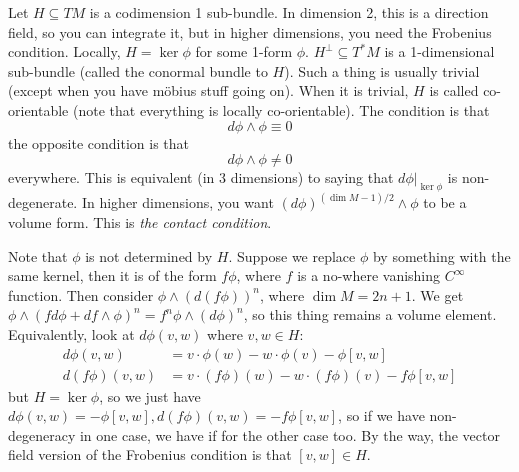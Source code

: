  \setcounter{lecture}{6}

 Let $H\subseteq TM$ is a codimension 1 sub-bundle.  In dimension
 2, this is a direction field, so you can integrate it, but in
 higher dimensions, you need the Frobenius condition.  Locally,
 $H=\ker \phi$ for some 1-form $\phi$.  $H^\perp \subseteq T^*M$
 is a 1-dimensional sub-bundle (called the conormal bundle to
 $H$).  Such a thing is usually trivial (except when you have
 m\"obius stuff going on).  When it is trivial, $H$ is called
 co-orientable (note that everything is locally co-orientable).
 The condition is that
 \[
    d\phi\wedge \phi \equiv 0
 \]
 the opposite condition is that
 \[
    d\phi\wedge \phi \not= 0
 \]
 everywhere.  This is equivalent (in 3 dimensions) to saying that
 $d\phi|_{\ker \phi}$ is non-degenerate.  In higher dimensions,
 you want $(d\phi)^{(\dim M -1)/2}\wedge \phi$ to be a volume
 form.  This is \emph{the contact condition}.

 Note that $\phi$ is not determined by $H$.  Suppose we replace
 $\phi$ by something with the same kernel, then it is of the form
 $f\phi$, where $f$ is a no-where vanishing $C^\infty$ function.
 Then consider $\phi\wedge (d(f\phi))^n$, where $\dim M=2n+1$.  We
 get $\phi\wedge (fd\phi + df\wedge \phi)^n = f^n\phi\wedge
 (d\phi)^n$, so this thing remains a volume element.
 Equivalently, look at $d\phi(v,w)$ where $v,w\in H$:
 \begin{align*}
   d\phi(v,w) &= v\cdot \phi(w) - w\cdot \phi(v) - \phi[v,w]\\
   d(f\phi)(v,w) & = v\cdot (f\phi)(w) - w\cdot (f\phi)(v) -
   f\phi[v,w]
 \end{align*}
 but $H = \ker \phi$, so we just have $d\phi(v,w) = -\phi[v,w],
 d(f\phi)(v,w) = -f\phi[v,w]$, so if we have non-degeneracy in one
 case, we have if for the other case too.  By the way, the vector
 field version of the Frobenius condition is that $[v,w]\in H$.

